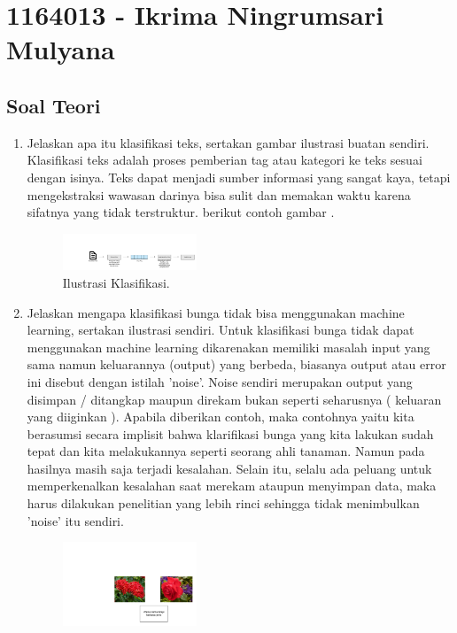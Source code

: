 \section{1164013 - Ikrima Ningrumsari Mulyana}
\subsection{Soal Teori}
\begin{enumerate}
	
	\item Jelaskan apa itu klasifikasi teks, sertakan gambar ilustrasi buatan sendiri.
	\hfill\break
	Klasiﬁkasi teks adalah proses pemberian tag atau kategori ke teks sesuai dengan isinya. Teks dapat menjadi sumber informasi yang sangat kaya, tetapi mengekstraksi wawasan darinya bisa sulit dan memakan waktu karena sifatnya yang tidak terstruktur. berikut contoh gambar .
	\begin{figure}[H]
		\centering
		\includegraphics[width=4cm]{figures/1164013/4/1.png}
		\caption{Ilustrasi Klasiﬁkasi.}
	\end{figure}
	\item Jelaskan mengapa klasifikasi bunga tidak bisa menggunakan machine learning, sertakan ilustrasi sendiri.
	\hfill\break
    Untuk klasiﬁkasi bunga tidak dapat menggunakan machine learning dikarenakan memiliki masalah input yang sama namun keluarannya (output) yang berbeda, biasanya output atau error ini disebut dengan istilah ’noise’. Noise sendiri merupakan output yang disimpan / ditangkap maupun direkam bukan seperti seharusnya ( keluaran yang diiginkan ). Apabila diberikan contoh, maka contohnya yaitu kita berasumsi secara implisit bahwa klariﬁkasi bunga yang kita lakukan sudah tepat dan kita melakukannya seperti seorang ahli tanaman. Namun pada hasilnya masih saja terjadi kesalahan. Selain itu, selalu ada peluang untuk memperkenalkan kesalahan saat merekam ataupun menyimpan data, maka harus dilakukan penelitian yang lebih rinci sehingga tidak menimbulkan ’noise’ itu sendiri.
	\begin{figure}[H]
		\centering
		\includegraphics[width=4cm]{figures/1164013/4/2.png}

\end{figure}
\end{enumerate}
